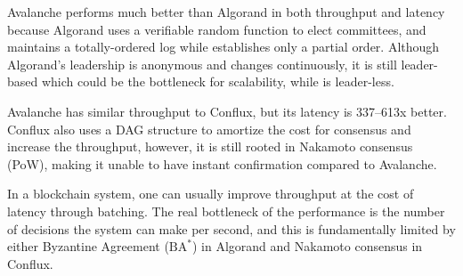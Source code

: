 Avalanche performs much better than Algorand in both throughput and latency
because Algorand uses a verifiable random function to elect committees, and
maintains a totally-ordered log while {\sysname} establishes only a partial
order. Although Algorand's leadership is anonymous and changes continuously,
it is still leader-based which could be the bottleneck for scalability, while
{\sysname} is leader-less.

Avalanche has similar throughput to Conflux, but its latency is 337--613x better.
Conflux also uses a DAG structure to amortize the cost for consensus and increase the throughput,
however, it is still rooted in Nakamoto consensus (PoW), making it unable to
have instant confirmation compared to Avalanche.

In a blockchain system, one can usually improve throughput at the cost of latency through batching. The real bottleneck of the performance is the number of decisions the system can make per second, and this is fundamentally limited by either Byzantine Agreement ($\mathrm{BA}^{*}$) in Algorand and Nakamoto consensus in Conflux.
